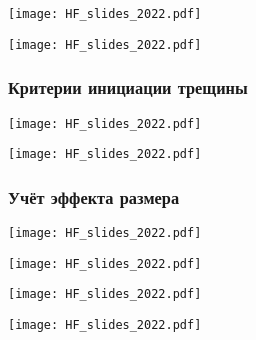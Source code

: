 \documentclass[main.tex]{subfiles}
\begin{document}
\texttt{[image: HF\_slides\_2022.pdf]}

\texttt{[image: HF\_slides\_2022.pdf]}

\subsubsection{Критерии инициации трещины}

\texttt{[image: HF\_slides\_2022.pdf]}

\texttt{[image: HF\_slides\_2022.pdf]}

\subsubsection{Учёт эффекта размера}

\texttt{[image: HF\_slides\_2022.pdf]}

\texttt{[image: HF\_slides\_2022.pdf]}

\texttt{[image: HF\_slides\_2022.pdf]}

\texttt{[image: HF\_slides\_2022.pdf]}
\end{document}
